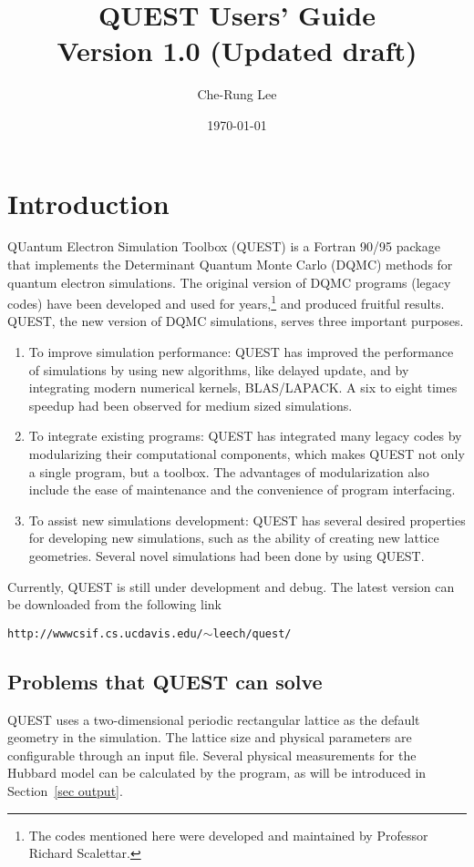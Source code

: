 \documentclass[12pt]{article}
\title{QUEST Users' Guide \\  
Version 1.0 (Updated draft)}
\author{Che-Rung Lee}
\date{\today}
\begin{document}
\maketitle
\newpage
\tableofcontents
\thispagestyle{empty}
\newpage
\section{Introduction}
   QUantum Electron Simulation Toolbox (QUEST) is a Fortran
   90/95 package that implements the Determinant Quantum Monte Carlo (DQMC) methods for
   quantum electron simulations.
   The original version of DQMC programs (legacy codes) have been
   developed and used for years,\footnote{The codes mentioned here were developed and maintained by Professor Richard Scalettar.} and produced fruitful results.
   QUEST, the new version of DQMC simulations, serves three important purposes.
   \begin{enumerate}
     \item To improve simulation performance: QUEST has improved the performance of simulations by using new algorithms, like delayed update, and by integrating modern numerical kernels, BLAS/LAPACK. A six to eight times speedup had been observed for medium sized simulations.
     \item To integrate existing programs: QUEST has integrated many legacy codes by modularizing their computational components, which makes QUEST not only a single program, but a toolbox. The advantages of modularization also include the ease of maintenance and the convenience of program interfacing.
     \item To assist new simulations development: QUEST has several desired properties for developing new simulations, such as the ability of creating new lattice geometries. Several novel simulations had been done by using QUEST.
   \end{enumerate}

    Currently, QUEST is still under development and debug.
    The latest version can be downloaded from the following link
    \begin{center}
    {\tt http://wwwcsif.cs.ucdavis.edu/$\sim$leech/quest/}
    \end{center}

\subsection{Problems that QUEST can solve}
    QUEST uses a two-dimensional periodic rectangular lattice as
    the default geometry in the simulation. The lattice size and physical parameters are configurable through an input file.
    Several physical measurements for the Hubbard model can be calculated by the program, as will be introduced in Section~\ref{sec output}.
\end{document}
